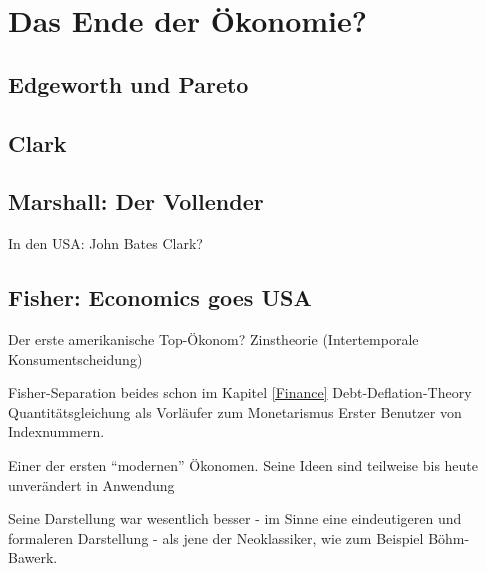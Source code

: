 %
%
%

\chapter{Das Ende der Ökonomie?}
\label{Neoklassik}

\section{Edgeworth und Pareto}

\section{Clark}

\section{Marshall: Der Vollender}
In den USA: John Bates Clark?


\section{Fisher: Economics goes USA}
Der erste amerikanische Top-Ökonom?
Zinstheorie (Intertemporale Konsumentscheidung)

Fisher-Separation
beides schon im Kapitel \ref{Finance}
Debt-Deflation-Theory
Quantitätsgleichung als Vorläufer zum Monetarismus
Erster Benutzer von Indexnummern.

Einer der ersten "`modernen"' Ökonomen. Seine Ideen sind teilweise bis heute unverändert in Anwendung

Seine Darstellung war wesentlich besser - im Sinne eine eindeutigeren und formaleren Darstellung - als jene der Neoklassiker, wie zum Beispiel Böhm-Bawerk.


\textcite{Tobin2005}